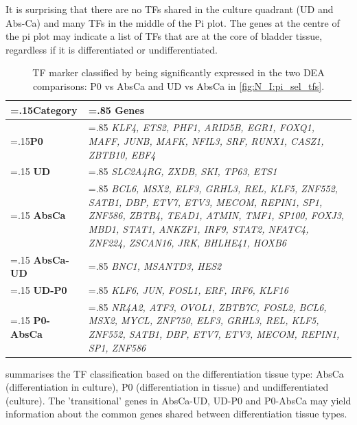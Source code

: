 It is surprising that there are no TFs shared in the culture quadrant (UD and Abs-Ca) and many TFs in the middle of the Pi plot. The genes at the centre of the pi plot may indicate a list of TFs that are at the core of bladder tissue, regardless if it is differentiated or undifferentiated.

\begin{table}[H]
  \centering
  \begin{tabularx}{\textwidth}{>{\hsize=.15\hsize}X|>{\hsize=.85\hsize}X}
    \toprule
    \textbf{Category} & \textbf{Genes} \\
    \midrule
    \textbf{P0} & \textit{KLF4, ETS2, PHF1, ARID5B, EGR1, FOXQ1, MAFF, JUNB, MAFK, NFIL3, SRF, RUNX1, CASZ1, ZBTB10, EBF4} \\
    \midrule
    \textbf{UD} & \textit{SLC2A4RG, ZXDB, SKI, TP63, ETS1} \\
    \midrule
    \textbf{AbsCa} & \textit{BCL6, MSX2, ELF3, GRHL3, REL, KLF5, ZNF552, SATB1, DBP, ETV7, ETV3, MECOM, REPIN1, SP1, ZNF586, ZBTB4, TEAD1, ATMIN, TMF1, SP100, FOXJ3, MBD1, STAT1, ANKZF1, IRF9, STAT2, NFATC4, ZNF224, ZSCAN16, JRK, BHLHE41, HOXB6} \\
    \midrule
    \textbf{AbsCa-UD} & \textit{BNC1, MSANTD3, HES2} \\
    \midrule
    \textbf{UD-P0} & \textit{KLF6, JUN, FOSL1, ERF, IRF6, KLF16} \\
    \midrule
    \textbf{P0-AbsCa} & \textit{NR4A2, ATF3, OVOL1, ZBTB7C, FOSL2, BCL6, MSX2, MYCL, ZNF750, ELF3, GRHL3, REL, KLF5, ZNF552, SATB1, DBP, ETV7, ETV3, MECOM, REPIN1, SP1, ZNF586} \\
    \bottomrule
  \end{tabularx}
  \caption{TF marker classified by being significantly expressed in the two DEA comparisons: P0 vs AbsCa and UD vs AbsCa in \cref{fig:N_I:pi_sel_tfs}.} 
  \label{tab:N_I:markers_diff}
\end{table}

 summarises the TF classification based on the differentiation tissue type: AbsCa (differentiation in culture), P0 (differentiation in tissue) and undifferentiated (culture). The 'transitional' genes in AbsCa-UD, UD-P0 and P0-AbsCa may yield information about the common genes shared between differentiation tissue types.

